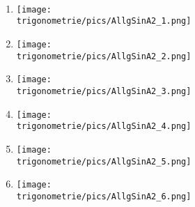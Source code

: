 \documentclass[a4paper,12pt, headsepline, ngerman]{scrartcl}
\theoremstyle{definition}
\begin{document}
\begin{Exercise}[title={Stelle jeweils die Funktionsgleichung vom Typ \(a\cdot \sin\left(bx\right)+d\)\\oder \(a\cdot \cos\left(bx\right)+d\) auf.}, label=allgSinCosA2]\\
	\begin{minipage}{\textwidth}
		\begin{minipage}{0.49\textwidth}
			\begin{enumerate}[label=\alph*)]
				\item \begin{minipage}{.9\textwidth}
					\texttt{[image: \\trigonometrie/pics/AllgSinA2\_1.png]}\\
				\end{minipage}	
				\item \begin{minipage}{.9\textwidth}
					\texttt{[image: \\trigonometrie/pics/AllgSinA2\_2.png]}\\
				\end{minipage}
				\item \begin{minipage}{.9\textwidth}
					\texttt{[image: \\trigonometrie/pics/AllgSinA2\_3.png]}\\
				\end{minipage}
				\item \begin{minipage}{.9\textwidth}
					\texttt{[image: \\trigonometrie/pics/AllgSinA2\_4.png]}\\
				\end{minipage}
				\item \begin{minipage}{.9\textwidth}
					\texttt{[image: \\trigonometrie/pics/AllgSinA2\_5.png]}\\
				\end{minipage}
			\end{enumerate}
		\end{minipage}
		\begin{minipage}{0.49\textwidth}
			\begin{enumerate}[label=\alph*)]
				\setcounter{enumi}{5}
				\item \begin{minipage}{.9\textwidth}
					\texttt{[image: \\trigonometrie/pics/AllgSinA2\_6.png]}\\
				\end{minipage}	

\end{enumerate}
\end{minipage}
\end{minipage}
\end{Exercise}
\end{document}
